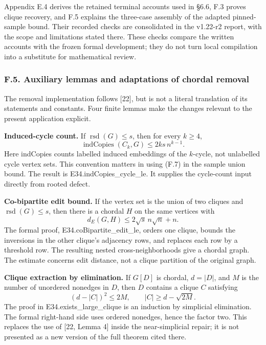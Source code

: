 \documentclass[english,11pt,a4paper]{article}
\newcounter{none}
\begin{document}
Appendix E.4 derives the retained terminal accounts used in §6.6, F.3 proves clique recovery, and F.5 explains the three-case assembly of the adapted pinned-sample bound. Their recorded checks are consolidated in the v1.22-r2 report, with the scope and limitations stated there. These checks compare the written accounts with the frozen formal development; they do not turn local compilation into a substitute for mathematical review.

\subsubsection{F.5. Auxiliary lemmas and adaptations of chordal removal}\label{f.5.-auxiliary-lemmas-and-adaptations-of-chordal-removal}

The removal implementation follows {[}22{]}, but is not a literal translation of its statements and constants. Four finite lemmas make the changes relevant to the present application explicit.

\textbf{Induced-cycle count.} If \(\operatorname{rsd}(G)\le s\), then for every \(k\ge4\), \[
\operatorname{indCopies}(C_k,G)\le2ks\,n^{k-1}.
\tag{F.7}
\] Here indCopies counts labelled induced embeddings of the \(k\)-cycle, not unlabelled cycle vertex sets. This convention matters in using (F.7) in the sample union bound. The result is {\ttfamily\small E34.\discretionary{\hbox{\ensuremath{\hookrightarrow}}}{}{}indCopies\_\discretionary{\hbox{\ensuremath{\hookrightarrow}}}{}{}cycle\_\discretionary{\hbox{\ensuremath{\hookrightarrow}}}{}{}le}. It supplies the cycle-count input directly from rooted defect.

\textbf{Co-bipartite edit bound.} If the vertex set is the union of two cliques and \(\operatorname{rsd}(G)\le s\), then there is a chordal \(H\) on the same vertices with \[
d_E(G,H)\le2\sqrt{s}\,n\sqrt n+n.
\tag{F.8}
\] The formal proof, {\ttfamily\small E34.\discretionary{\hbox{\ensuremath{\hookrightarrow}}}{}{}coBipartite\_\discretionary{\hbox{\ensuremath{\hookrightarrow}}}{}{}edit\_\discretionary{\hbox{\ensuremath{\hookrightarrow}}}{}{}le}, orders one clique, bounds the inversions in the other clique's adjacency rows, and replaces each row by a threshold row. The resulting nested cross-neighborhoods give a chordal graph. The estimate concerns edit distance, not a clique partition of the original graph.

\textbf{Clique extraction by elimination.} If \(G[D]\) is chordal, \(d=|D|\), and \(M\) is the number of unordered nonedges in \(D\), then \(D\) contains a clique \(C\) satisfying \[
(d-|C|)^2\le2M,\qquad |C|\ge d-\sqrt{2M}.
\tag{F.9}
\] The proof in {\ttfamily\small E34.\discretionary{\hbox{\ensuremath{\hookrightarrow}}}{}{}exists\_\discretionary{\hbox{\ensuremath{\hookrightarrow}}}{}{}large\_\discretionary{\hbox{\ensuremath{\hookrightarrow}}}{}{}clique} is an induction by simplicial elimination. The formal right-hand side uses ordered nonedges, hence the factor two. This replaces the use of {[}22, Lemma 4{]} inside the near-simplicial repair; it is not presented as a new version of the full theorem cited there.
\end{document}
